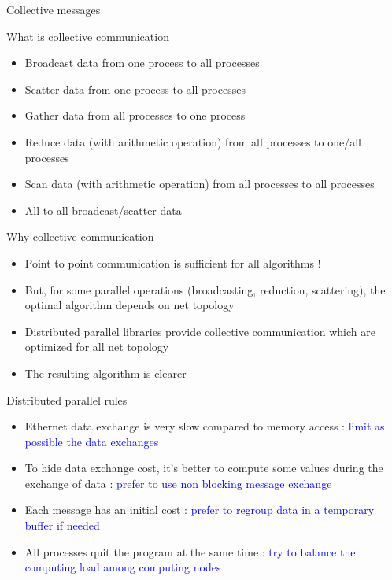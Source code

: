 \documentclass[compress,10pt,aspectratio=169]{beamer}
\begin{document}
\begin{frame}[fragile]{Collective messages}
\scriptsize
\begin{exampleblock}{\scriptsize What is collective communication}
    \begin{itemize}
        \item Broadcast data from one process to all processes
        \item Scatter data from one process to all processes
        \item Gather data from all processes to one process
        \item Reduce data (with arithmetic operation) from all processes to one/all processes
        \item Scan data (with arithmetic operation) from all processes to all processes
        \item All to all broadcast/scatter data
    \end{itemize}
\end{exampleblock}

\begin{alertblock}{\scriptsize Why collective communication}
\begin{itemize}
    \item Point to point communication is sufficient for all algorithms !
    \item But, for some parallel operations (broadcasting, reduction, scattering), the optimal algorithm depends on net topology
    \item Distributed parallel libraries provide collective communication which are optimized for all net topology
    \item The resulting algorithm is clearer
\end{itemize}
\end{alertblock}
\end{frame}

\begin{frame}[fragile]{Distributed parallel rules}

    \begin{itemize}
        \item Ethernet data exchange is very slow compared to memory access : \textcolor{blue}{limit as possible the data exchanges}
        \item To hide data exchange cost, it's better to compute some values during the exchange of data : \textcolor{blue}{prefer to use non blocking message exchange}
        \item Each message has an initial cost : \textcolor{blue}{prefer to regroup data in a temporary buffer if needed}
        \item All processes quit the program at the same time : \textcolor{blue}{try to balance the computing load among computing nodes}
    \end{itemize}
\end{frame}
\end{document}
